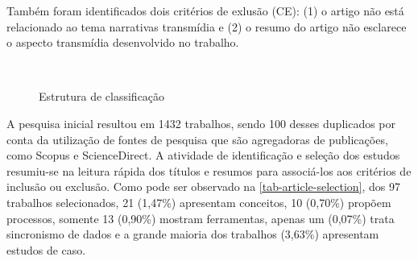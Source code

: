 \documentclass[
article,			%
11pt,				%
oneside,			%
a4paper,			%
english,			%
brazil,				%
sumario=tradicional
]{abntex2}
\begin{document}
  Também foram identificados dois critérios de exlusão (CE): (1) o artigo não está relacionado ao tema narrativas transmídia e (2) o resumo do artigo não esclarece o aspecto transmídia desenvolvido no trabalho.

  \begin{figure}[htb]
    \caption{\label{diag-trata-de-para}Estrutura de classificação}
    \begin{center}
       \\
    \end{center}
  \end{figure}

  A pesquisa inicial resultou em 1432 trabalhos, sendo 100 desses duplicados por conta da utilização de fontes de pesquisa que são agregadoras de publicações, como Scopus e ScienceDirect. A atividade de identificação e seleção dos estudos resumiu-se na leitura rápida dos títulos e resumos para associá-los aos critérios de inclusão ou exclusão. Como pode ser observado na \autoref{tab-article-selection}, dos 97 trabalhos selecionados, 21 (1,47\%) apresentam conceitos, 10 (0,70\%) propõem processos, somente 13 (0,90\%) mostram ferramentas, apenas um (0,07\%) trata sincronismo de dados e a grande maioria dos trabalhos (3,63\%) apresentam estudos de caso.
\end{document}
